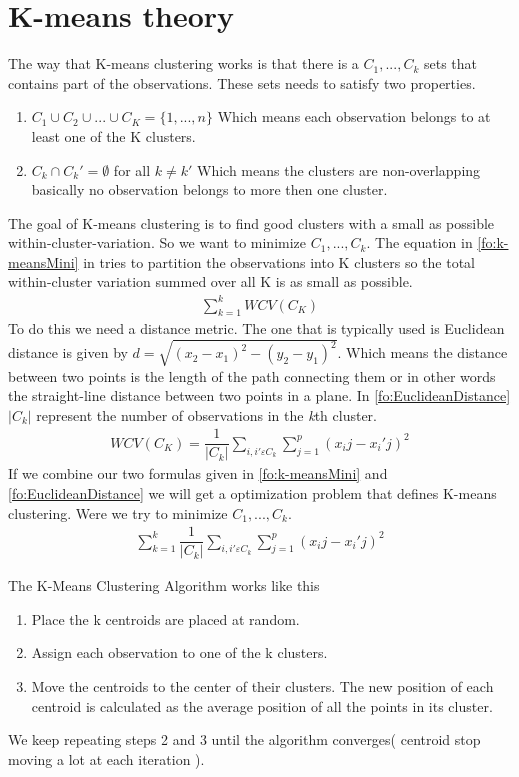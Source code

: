 \section{K-means theory}
The way that K-means clustering works is that there is a $C_1,...,C_k$ sets that contains part of the observations. These sets needs to satisfy two properties.
\begin{enumerate}
	\item $ C_1 \cup C_2 \cup ... \cup C_K = \{ 1,...,n \}$ Which means each observation belongs to at least one of the K clusters.
	\item $ C_k \cap C_k' = \emptyset $ for all $k \neq k'$ Which means the clusters are non-overlapping basically no observation belongs to more then one cluster.
\end{enumerate}

The goal of K-means clustering is to find good clusters with a small as possible within-cluster-variation. So we want to minimize $ C_1,...,C_k $. The equation in \ref{fo:k-meansMini} in tries to partition the observations into K clusters so the total within-cluster variation summed over all K is as small as possible.
\begin{align}\label{fo:k-meansMini}
\sum_{k=1}^{k} WCV(C_K)
\end{align}
To do this we need a distance metric. The one that is typically used is Euclidean distance is given by $d = \sqrt{ (x_2 - x_1)^2 - (y_2 - y_1)^2 } $. Which means the distance between two points is the length of the path connecting them or in other words the straight-line distance between two points in a plane. In \ref{fo:EuclideanDistance} $ |C_k| $ represent the number of observations in the \textit{k}th cluster.
\begin{align}\label{fo:EuclideanDistance}
WCV(C_K) = \dfrac{1}{|C_k|}  \sum_{i,i' \varepsilon C_k}   \sum_{j=1}^{p}(x_ij - x_i'j)^2
\end{align}
If we combine our two formulas given in \ref{fo:k-meansMini} and \ref{fo:EuclideanDistance} we will get a optimization problem that defines K-means clustering. Were we try to minimize $ C_1,...,C_k $.
\begin{align}\label{fo:EuclideanDistance}
\sum_{k=1}^{k} \dfrac{1}{|C_k|}  \sum_{i,i' \varepsilon C_k}   \sum_{j=1}^{p}(x_ij - x_i'j)^2
\end{align}

The K-Means Clustering Algorithm works like this
\begin{enumerate}
	\item Place the k centroids are placed at random.
	\item Assign each observation to one of the k clusters.
	\item Move the centroids to the center of their clusters. The new position of each centroid is calculated as the average position of all the points in its cluster.
\end{enumerate}
We keep repeating steps 2 and 3 until the algorithm converges( centroid stop moving a lot at each iteration ).

